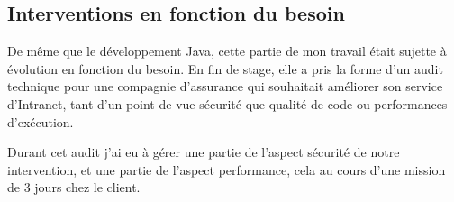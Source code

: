 \subsection{Interventions en fonction du besoin}
De même que le développement Java, cette partie de mon travail était sujette à évolution en fonction du besoin. En fin de stage, elle a pris la forme d'un audit technique pour une compagnie d'assurance qui souhaitait améliorer son service d'Intranet, tant d'un point de vue sécurité que qualité de code ou performances d'exécution. 

Durant cet audit j'ai eu à gérer une partie de l'aspect sécurité de notre intervention, et une partie de l'aspect performance, cela au cours d'une mission de 3 jours chez le client. 
